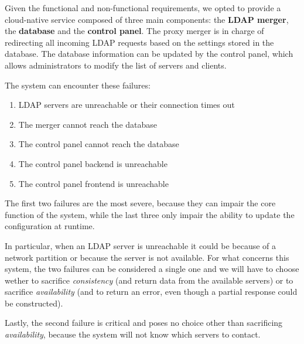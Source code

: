 \documentclass{scrartcl}
\begin{document}
\par Given the functional and non-functional requirements, we opted to provide a cloud-native service composed of three main components: the \textbf{LDAP merger}, the \textbf{database} and the \textbf{control panel}. The proxy merger is in charge of redirecting all incoming LDAP requests based on the settings stored in the database. The database information can be updated by the control panel, which allows administrators to modify the list of servers and clients.
\par The system can encounter these failures:
\begin{enumerate}
	\item LDAP servers are unreachable or their connection times out
	\item The merger cannot reach the database
	\item The control panel cannot reach the database
	\item The control panel backend is unreachable
	\item The control panel frontend is unreachable
\end{enumerate}

\par The first two failures are the most severe, because they can impair the core function of the system, while the last three only impair the ability to update the configuration at runtime.
\par In particular, when an LDAP server is unreachable it could be because of a network partition or because the server is not available. For what concerns this system, the two failures can be considered a single one and we will have to choose wether to sacrifice \textit{consistency} (and return data from the available servers) or to sacrifice \textit{availability} (and to return an error, even though a partial response could be constructed).
\par Lastly, the second failure is critical and poses no choice other than sacrificing \textit{availability}, because the system will not know which servers to contact.
\end{document}
